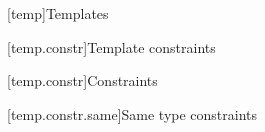 
\setcounter{chapter}{13}
[temp]{Templates}

\setcounter{section}{9}
[temp.constr]{Template constraints}

[temp.constr]{Constraints}

\setcounter{subsubsection}{6}
[temp.constr.same]{Same type constraints}


